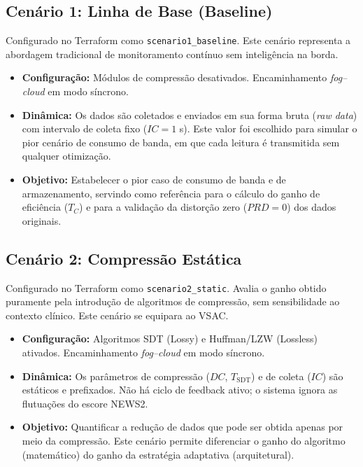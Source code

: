 \documentclass[twoside,english,brazilian]{UNISINOSmonografia}
\begin{document}
\subsection{Cenário 1: Linha de Base (Baseline)}
Configurado no Terraform como \texttt{scenario1\_baseline}. Este cenário representa a abordagem tradicional de monitoramento contínuo sem inteligência na borda.
\begin{itemize}
    \item \textbf{Configuração:} Módulos de compressão desativados. Encaminhamento \textit{fog–cloud} em modo síncrono.
    \item \textbf{Dinâmica:} Os dados são coletados e enviados em sua forma bruta (\textit{raw data}) com intervalo de coleta fixo ($IC = 1$ s). Este valor foi escolhido para simular o pior cenário de consumo de banda, em que cada leitura é transmitida sem qualquer otimização.
    \item \textbf{Objetivo:} Estabelecer o pior caso de consumo de banda e de armazenamento, servindo como referência para o cálculo do ganho de eficiência ($T_C$) e para a validação da distorção zero ($PRD = 0$) dos dados originais.
\end{itemize}

\subsection{Cenário 2: Compressão Estática}
Configurado no Terraform como \texttt{scenario2\_static}. Avalia o ganho obtido puramente pela introdução de algoritmos de compressão, sem sensibilidade ao contexto clínico. Este cenário se equipara ao VSAC.
\begin{itemize}
    \item \textbf{Configuração:} Algoritmos SDT (Lossy) e Huffman/LZW (Lossless) ativados. Encaminhamento \textit{fog–cloud} em modo síncrono.
    \item \textbf{Dinâmica:} Os parâmetros de compressão ($DC$, $T_{\text{SDT}}$) e de coleta ($IC$) são estáticos e prefixados. Não há ciclo de feedback ativo; o sistema ignora as flutuações do escore NEWS2.
    \item \textbf{Objetivo:} Quantificar a redução de dados que pode ser obtida apenas por meio da compressão. Este cenário permite diferenciar o ganho do algoritmo (matemático) do ganho da estratégia adaptativa (arquitetural).
\end{itemize}
\end{document}
